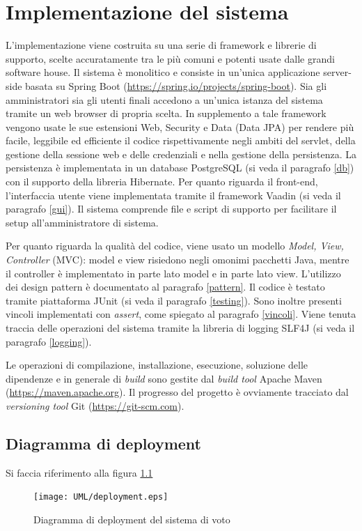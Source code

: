 \chapter{Implementazione del sistema}\label{implementazione}
L'implementazione viene costruita su una serie di framework e librerie di supporto, scelte accuratamente tra le più comuni e potenti usate dalle grandi software house. Il sistema è monolitico e consiste in un'unica applicazione server-side basata su Spring Boot (\url{https://spring.io/projects/spring-boot}). Sia gli amministratori sia gli utenti finali accedono a un'unica istanza del sistema tramite un web browser di propria scelta. In supplemento a tale framework vengono usate le sue estensioni Web, Security e Data (Data JPA) per rendere più facile, leggibile ed efficiente il codice rispettivamente negli ambiti del servlet, della gestione della sessione web e delle credenziali e nella gestione della persistenza. La persistenza è implementata in un database PostgreSQL (si veda il paragrafo \ref{db}) con il supporto della libreria Hibernate. Per quanto riguarda il front-end, l'interfaccia utente viene implementata tramite il framework Vaadin (si veda il paragrafo \ref{gui}). Il sistema comprende file e script di supporto per facilitare il setup all'amministratore di sistema.

Per quanto riguarda la qualità del codice, viene usato un modello \emph{Model, View, Controller} (MVC): model e view risiedono negli omonimi pacchetti Java, mentre il controller è implementato in parte lato model e in parte lato view. L'utilizzo dei design pattern è documentato al paragrafo \ref{pattern}. Il codice è testato tramite piattaforma JUnit (si veda il paragrafo \ref{testing}). Sono inoltre presenti vincoli implementati con \emph{assert}, come spiegato al paragrafo \ref{vincoli}. Viene tenuta traccia delle operazioni del sistema tramite la libreria di logging SLF4J (si veda il paragrafo \ref{logging}).

Le operazioni di compilazione, installazione, esecuzione, soluzione delle dipendenze e in generale di \emph{build} sono gestite dal \emph{build tool} Apache Maven (\url{https://maven.apache.org}). Il progresso del progetto è ovviamente tracciato dal \emph{versioning tool} Git (\url{https://git-scm.com}).




\section{Diagramma di deployment}\label{deployment}
Si faccia riferimento alla figura \ref{fig:deployment}
\begin{figure}[ht]
	\centering
	\texttt{[image: UML/deployment.eps]}
	\caption{Diagramma di deployment del sistema di voto}
	\label{fig:deployment}
\end{figure}




